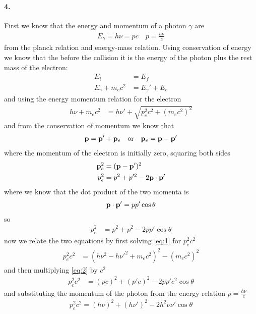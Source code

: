 \documentclass[../main.tex]{subfiles}
\begin{document}
\paragraph{4.} First we know that the energy and momentum of a photon $\gamma$ are
\begin{align*}
    E_\gamma = h\nu = pc \quad p = \frac{h\nu}{c}
\end{align*}
from the planck relation and energy-mass relation. Using conservation of energy we know that the 
before the collision it is the energy of the photon plus the rest mass of the electron:
\begin{align*}
    E_i &= E_f \\
    E_\gamma + m_e c^2 &= E_\gamma' + E_e
\end{align*}
and using the energy momentum relation for the electron
\begin{align} \label{eq:1} \tag{1}
    h\nu + m_e c^2 &= h\nu' + \sqrt{p_e^2c^2 + (m_e c^2)^2}
\end{align}
and from the conservation of momentum we know that 
\begin{align*}
    \vb p = \vb p' + \vb p_e \qor \vb p_e = \vb p - \vb p'
\end{align*}
where the momentum of the electron is initially zero, squaring both sides
\begin{align*}
    \vb p_e^2 &= (\vb p - \vb p')^2 \\
    p_e^2 &= p^2 + p'^2 - 2 \vb p \cdot \vb p'
\end{align*}
where we know that the dot product of the two momenta is
\begin{align*}
    \vb p \cdot \vb p' = p p' \cos \theta
\end{align*}
so
\begin{align} \label{eq:2} \tag{2}
    p_e^2 &= p^2 + p^2 - 2 p p' \cos \theta
\end{align}
now we relate the two equations by first solving \eqref{eq:1} for $p_e^2 c^2$
\begin{align*}
    p_e^2 c^2 &= (h\nu^2 - h\nu'^2 + m_e c^2)^2 - (m_e c^2)^2
\end{align*}
and then multiplying \eqref{eq:2} by $c^2$
\begin{align*}
    p_e^2 c^2 &= (pc)^2 + (p' c)^2 - 2 p p' c^2 \cos \theta
\end{align*}
and substituting the momentum of the photon from the energy relation $p = \frac{h\nu}{c}$
\begin{align*}
    p_e^2 c^2 = (h\nu)^2 + (h\nu')^2 - 2 h^2 \nu \nu' \cos \theta 
\end{align*}
\end{document}
